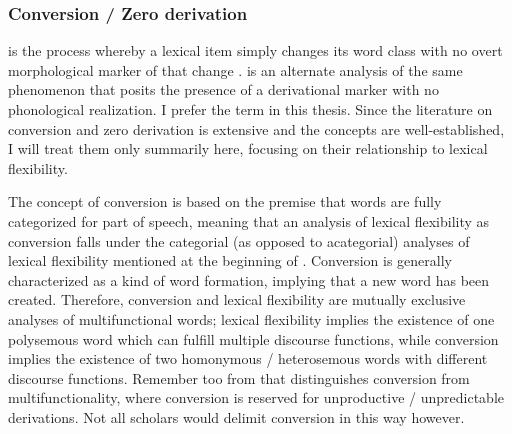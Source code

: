 \subsubsection{Conversion / Zero derivation}
\label{sec:2.3.1.7}

 is the process whereby a lexical item simply changes its word class with no overt morphological marker of that change \parencite[114]{Crystal2008}.  is an alternate analysis of the same phenomenon that posits the presence of a derivational marker with no phonological realization. I prefer the term  in this thesis. Since the literature on conversion and zero derivation is extensive and the concepts are well-established, I will treat them only summarily here, focusing on their relationship to lexical flexibility.

The concept of conversion is based on the premise that words are fully categorized for part of speech, meaning that an analysis of lexical flexibility as conversion falls under the categorial (as opposed to acategorial) analyses of lexical flexibility mentioned at the beginning of . Conversion is generally characterized as a kind of word formation, implying that a new word has been created. Therefore, conversion and lexical flexibility are mutually exclusive analyses of multifunctional words; lexical flexibility implies the existence of one polysemous word which can fulfill multiple discourse functions, while conversion implies the existence of two homonymous / heterosemous words with different discourse functions. Remember too from  that \textcite{Lier2012} distinguishes conversion from multifunctionality, where conversion is reserved for unproductive / unpredictable derivations. Not all scholars would delimit conversion in this way however.

